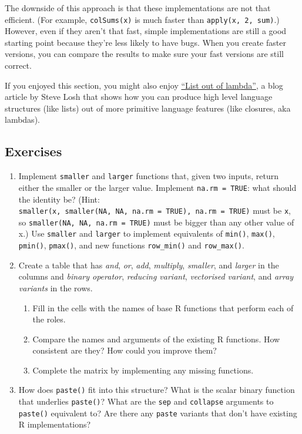 The downside of this approach is that these implementations are not that
efficient. (For example, \texttt{colSums(x)} is much faster than
\texttt{apply(x,\ 2,\ sum)}.) However, even if they aren't that fast,
simple implementations are still a good starting point because they're
less likely to have bugs. When you create faster versions, you can
compare the results to make sure your fast versions are still correct.

If you enjoyed this section, you might also enjoy
\href{http://stevelosh.com/blog/2013/03/list-out-of-lambda/}{``List out
of lambda''}, a blog article by Steve Losh that shows how you can
produce high level language structures (like lists) out of more
primitive language features (like closures, aka lambdas).

\hypertarget{exercises-5}{%
\subsection{Exercises}\label{exercises-5}}

\begin{enumerate}
\def\labelenumi{\arabic{enumi}.}
\item
  Implement \texttt{smaller} and \texttt{larger} functions that, given
  two inputs, return either the smaller or the larger value. Implement
  \texttt{na.rm\ =\ TRUE}: what should the identity be? (Hint:
  \texttt{smaller(x,\ smaller(NA,\ NA,\ na.rm\ =\ TRUE),\ na.rm\ =\ TRUE)}
  must be \texttt{x}, so \texttt{smaller(NA,\ NA,\ na.rm\ =\ TRUE)} must
  be bigger than any other value of x.) Use \texttt{smaller} and
  \texttt{larger} to implement equivalents of \texttt{min()},
  \texttt{max()}, \texttt{pmin()}, \texttt{pmax()}, and new functions
  \texttt{row\_min()} and \texttt{row\_max()}.
\item
  Create a table that has \emph{and}, \emph{or}, \emph{add},
  \emph{multiply}, \emph{smaller}, and \emph{larger} in the columns and
  \emph{binary operator}, \emph{reducing variant}, \emph{vectorised
  variant}, and \emph{array variants} in the rows.

  \begin{enumerate}
  \def\labelenumii{\alph{enumii})}
  \item
    Fill in the cells with the names of base R functions that perform
    each of the roles.
  \item
    Compare the names and arguments of the existing R functions. How
    consistent are they? How could you improve them?
  \item
    Complete the matrix by implementing any missing functions.
  \end{enumerate}
\item
  How does \texttt{paste()} fit into this structure? What is the scalar
  binary function that underlies \texttt{paste()}? What are the
  \texttt{sep} and \texttt{collapse} arguments to \texttt{paste()}
  equivalent to? Are there any \texttt{paste} variants that don't have
  existing R implementations?
\end{enumerate}
